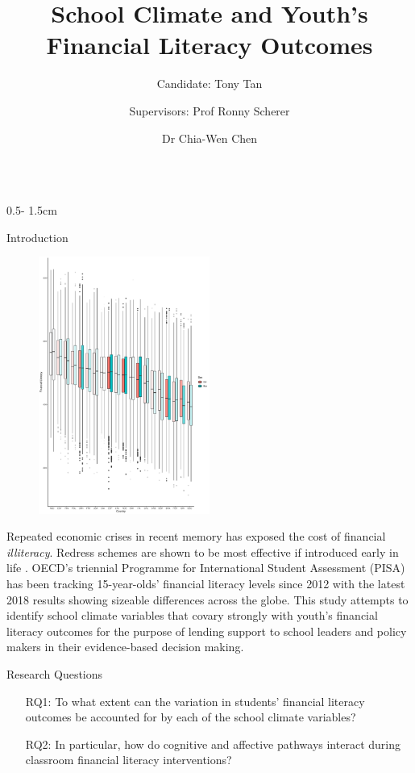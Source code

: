 \documentclass{uioposter}
\title{School Climate and Youth's Financial Literacy Outcomes}
\author
{%
    Candidate: Tony Tan%
    \and
    Supervisors: Prof Ronny Scherer%
    \and
    Dr Chia-Wen Chen%
}
\institute{Centre for Educational Measurement, Faculty of Educational Sciences, University of Oslo}
\begin{document}
\begin{frame}

\begin{columns}[onlytextwidth]

\begin{column}{0.5\textwidth - 1.5cm}

    \begin{block}{Introduction}
        \begin{figure}
            \centering
            \includegraphics[width=0.5\textwidth]{../Figures/distribution.pdf}
        \end{figure}
        Repeated economic crises in recent memory has exposed the cost of financial \emph{illiteracy}. Redress schemes are shown to be most effective if introduced early in life \parencite{lusardi:2014}. OECD's triennial Programme for International Student Assessment (PISA) has been tracking 15-year-olds' financial literacy levels since 2012 with the latest 2018 results showing sizeable differences across the globe. This study attempts to identify school climate variables that covary strongly with youth's financial literacy outcomes for the purpose of lending support to school leaders and policy makers in their evidence-based decision making.
    \end{block}

    \begin{block}{Research Questions}
        \begin{enumerate}
            \item[RQ1:] To what extent can the variation in students' financial literacy outcomes be accounted for by each of the school climate variables?
            \item[RQ2:] In particular, how do cognitive and affective pathways interact during classroom financial literacy interventions?
        \end{enumerate}
    \end{block}


\end{column}
\end{columns}
\end{frame}
\end{document}
